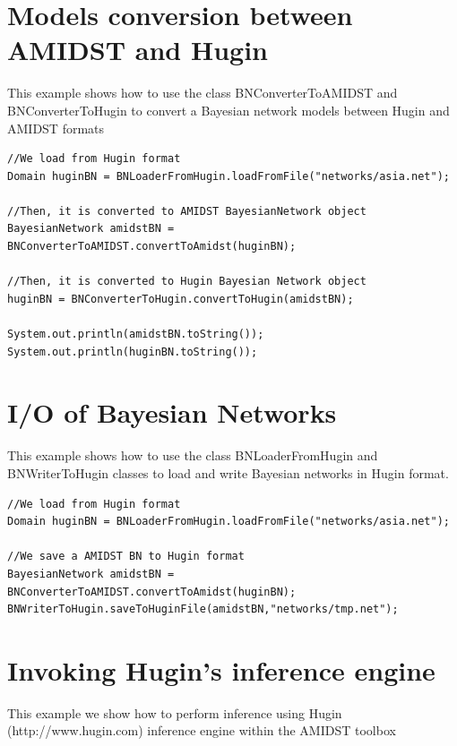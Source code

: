 \section{Models conversion between AMIDST and Hugin}

This example shows how to use the class BNConverterToAMIDST and BNConverterToHugin to convert a 
Bayesian network models between Hugin and AMIDST formats


\begin{lstlisting}
//We load from Hugin format
Domain huginBN = BNLoaderFromHugin.loadFromFile("networks/asia.net");

//Then, it is converted to AMIDST BayesianNetwork object
BayesianNetwork amidstBN = BNConverterToAMIDST.convertToAmidst(huginBN);

//Then, it is converted to Hugin Bayesian Network object
huginBN = BNConverterToHugin.convertToHugin(amidstBN);

System.out.println(amidstBN.toString());
System.out.println(huginBN.toString());
\end{lstlisting}



\section{I/O of Bayesian Networks}

This example shows how to use the class BNLoaderFromHugin and BNWriterToHugin classes to load and
write Bayesian networks in Hugin format.

\begin{lstlisting}
//We load from Hugin format
Domain huginBN = BNLoaderFromHugin.loadFromFile("networks/asia.net");

//We save a AMIDST BN to Hugin format
BayesianNetwork amidstBN = BNConverterToAMIDST.convertToAmidst(huginBN);
BNWriterToHugin.saveToHuginFile(amidstBN,"networks/tmp.net");
\end{lstlisting}

\section{Invoking Hugin's inference engine}

This example we show how to perform inference using Hugin (http://www.hugin.com) inference engine within the AMIDST toolbox

